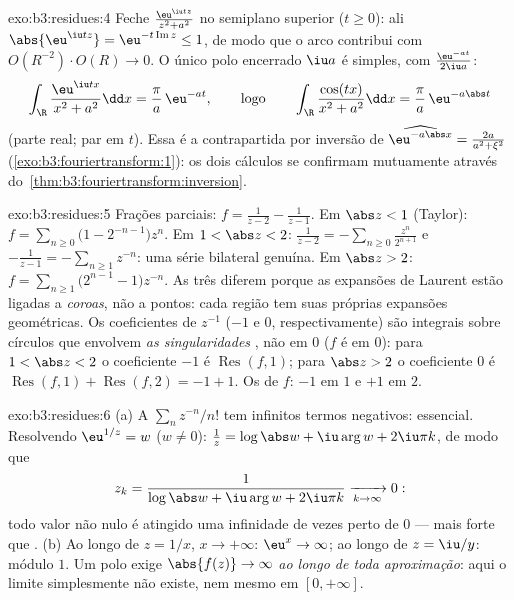 \begin{solution}{exo:b3:residues:4}
Feche $\frac{\eu^{\iu tz}}{z^2 + a^2}$ no semiplano superior
($t \geq 0$): ali $\abs{\eu^{\iu tz}} =
\eu^{-t\operatorname{Im}z} \leq 1$, de modo que o arco contribui com
$O(R^{-2})\cdot O(R) \to 0$. O único polo encerrado $\iu a$
é simples, com  $\frac{\eu^{-at}}{2\iu a}$:
\[
\int_\R\frac{\eu^{\iu tx}}{x^2 + a^2}\dd x =
\frac{\pi}{a}\,\eu^{-at},
\qquad\text{logo}\qquad
\int_\R\frac{\cos(tx)}{x^2+a^2}\dd x = \frac\pi
a\,\eu^{-a\abs t}
\]
(parte real; par em $t$). Essa é a contrapartida por inversão
de $\widehat{\eu^{-a\abs x}} = \frac{2a}{a^2+\xi^2}$
(\cref{exo:b3:fouriertransform:1}): os dois cálculos
se confirmam mutuamente através do~\cref{thm:b3:fouriertransform:inversion}.
\end{solution}

\begin{solution}{exo:b3:residues:5}
Frações parciais: $f = \frac1{z-2} - \frac1{z-1}$.
Em $\abs z < 1$ (Taylor):
$f = \sum_{n\geq0}\bigl(1 - 2^{-n-1}\bigr)z^n$.
Em $1 < \abs z < 2$: $\frac1{z-2} =
-\sum_{n\geq0}\frac{z^n}{2^{n+1}}$ e $-\frac1{z-1} =
-\sum_{n\geq1}z^{-n}$: uma série bilateral genuína.
Em $\abs z > 2$: $f = \sum_{n\geq1}\bigl(2^{n-1} -
1\bigr)z^{-n}$. As três diferem porque as expansões de Laurent
estão ligadas a \emph{coroas}, não a pontos: cada região tem suas
próprias expansões geométricas. Os coeficientes de $z^{-1}$ ($-1$ e
$0$, respectivamente) são integrais sobre círculos que envolvem
\emph{as singularidades }, não  em $0$ ($f$ é
 em $0$): para $1 < \abs z < 2$ o coeficiente
$-1$ é $\operatorname{Res}(f, 1)$; para $\abs z > 2$ o
coeficiente $0$ é $\operatorname{Res}(f,1) +
\operatorname{Res}(f,2) = -1 + 1$. Os  de $f$: $-1$
em $1$ e $+1$ em $2$.
\end{solution}

\begin{solution}{exo:b3:residues:6}
(a) A  $\sum_nz^{-n}/n!$ tem infinitos termos
negativos: essencial. Resolvendo $\eu^{1/z} = w$ ($w \neq
0$): $\frac1z = \log\abs w + \iu\arg w + 2\iu\pi k$, de modo que
\[
z_k = \frac1{\log\abs w + \iu\arg w + 2\iu\pi k}
\xrightarrow[k\to\infty]{} 0 :
\]
todo valor não nulo é atingido uma infinidade de vezes perto de $0$ ---
mais forte que .
(b) Ao longo de $z = 1/x$, $x \to +\infty$: $\eu^x \to \infty$;
ao longo de $z = \iu/y$: módulo $1$. Um polo exige
$\abs{f(z)} \to \infty$ \emph{ao longo de toda aproximação}: aqui o
limite simplesmente não existe, nem mesmo em $[0, +\infty]$.
\end{solution}

